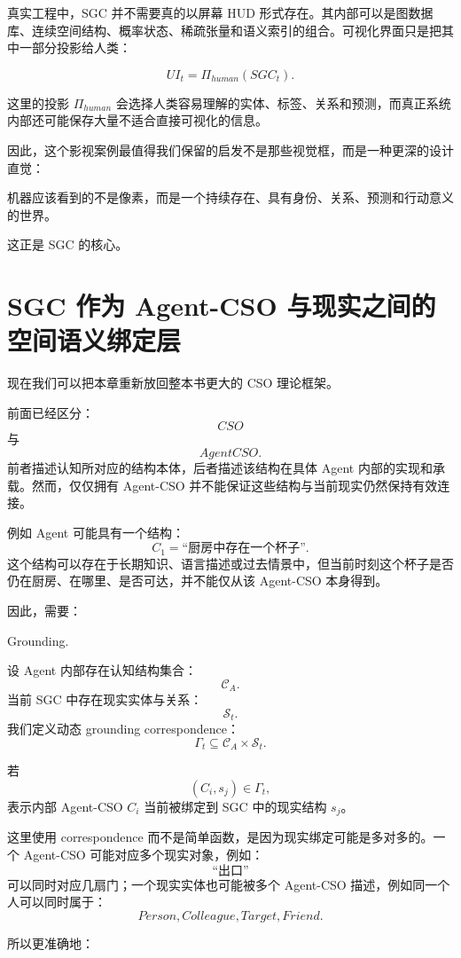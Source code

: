 真实工程中，SGC 并不需要真的以屏幕 HUD 形式存在。其内部可以是图数据库、连续空间结构、概率状态、稀疏张量和语义索引的组合。可视化界面只是把其中一部分投影给人类：

\[
UI_t
=
\Pi_{human}
(
SGC_t
).
\]

这里的投影 \(\Pi_{human}\) 会选择人类容易理解的实体、标签、关系和预测，而真正系统内部还可能保存大量不适合直接可视化的信息。

因此，这个影视案例最值得我们保留的启发不是那些视觉框，而是一种更深的设计直觉：

\begin{statementbox}
机器应该看到的不是像素，而是一个持续存在、具有身份、关系、预测和行动意义的世界。
\end{statementbox}

这正是 SGC 的核心。

\section{SGC 作为 Agent-CSO 与现实之间的空间语义绑定层}

现在我们可以把本章重新放回整本书更大的 CSO 理论框架。

前面已经区分：
\[
CSO
\]
与
\[
AgentCSO.
\]
前者描述认知所对应的结构本体，后者描述该结构在具体 Agent 内部的实现和承载。然而，仅仅拥有 Agent-CSO 并不能保证这些结构与当前现实仍然保持有效连接。

例如 Agent 可能具有一个结构：
\[
C_1=
\text{``厨房中存在一个杯子''}.
\]
这个结构可以存在于长期知识、语言描述或过去情景中，但当前时刻这个杯子是否仍在厨房、在哪里、是否可达，并不能仅从该 Agent-CSO 本身得到。

因此，需要：
\begin{statementbox}
Grounding.
\end{statementbox}

设 Agent 内部存在认知结构集合：
\[
\mathcal C_A.
\]
当前 SGC 中存在现实实体与关系：
\[
\mathcal S_t.
\]
我们定义动态 grounding correspondence：
\[
\Gamma_t
\subseteq
\mathcal C_A
\times
\mathcal S_t.
\]

若
\[
(C_i,s_j)\in\Gamma_t,
\]
表示内部 Agent-CSO \(C_i\) 当前被绑定到 SGC 中的现实结构 \(s_j\)。

这里使用 correspondence 而不是简单函数，是因为现实绑定可能是多对多的。一个 Agent-CSO 可能对应多个现实对象，例如：
\[
\text{``出口''}
\]
可以同时对应几扇门；一个现实实体也可能被多个 Agent-CSO 描述，例如同一个人可以同时属于：
\[
Person,
Colleague,
Target,
Friend.
\]

所以更准确地：
\begin{statementbox}
\centering
{}
\end{statementbox}

